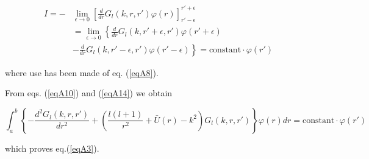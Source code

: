 \begin{equation}\label{eqA14}
\begin{split}
I=-& \lim_{\epsilon \rightarrow 0} \left[ \frac{d}{dr} G_l(k,r,r') \varphi(r) \right]^{r'+\epsilon}_{r'-\epsilon}\\
&= \lim_{\epsilon \rightarrow 0} \left\{ \frac{d}{dr} G_l(k,r'+\epsilon,r') \varphi(r'+\epsilon) \right. \\
&- \left.\frac{d}{dr} G_l(k,r'-\epsilon,r') \varphi(r'-\epsilon)\right\rbrace = \text{constant}\cdot\varphi(r')
\end{split}
\end{equation}

where use has been made of eq. (\ref{eqA8}).


From eqs.  (\ref{eqA10}) and  (\ref{eqA14}) we obtain

\begin{equation*}
\int_a^b\left\lbrace -\frac{d^2G_l(k,r,r')}{dr^2}+\left( \frac{l(l+1)}{r^2}+\bar U(r)-k^2\right) G_l(k,r,r')\right\rbrace \varphi(r) dr = \text{constant}\cdot\varphi(r')
\end{equation*}

which proves eq.(\ref{eqA3}).
















